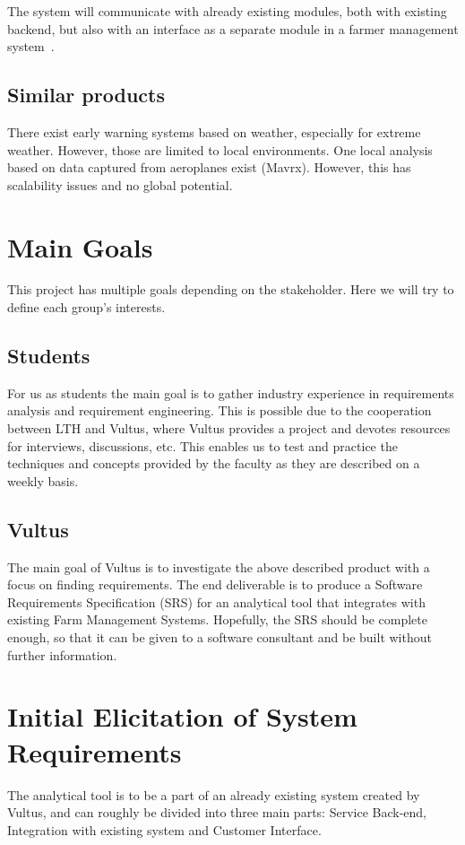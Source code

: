 \documentclass[a4paper]{article}
\begin{document}
The system will communicate with already existing modules, both with existing backend, but also with an interface as a separate module in a farmer management system~\cite{farmer_management_system}.

\subsection{Similar products}
There exist early warning systems based on weather, especially for extreme weather. However, those are limited to local environments. One local analysis based on data captured from aeroplanes exist (Mavrx). However, this has scalability issues and no global potential.


\section{Main Goals}
This project has multiple goals depending on the stakeholder. Here we will try to define each group's interests.

\subsection{Students}
For us as students the main goal is to gather industry experience in requirements analysis and requirement engineering. This is possible due to the cooperation between LTH and Vultus, where Vultus provides a project and devotes resources for interviews, discussions, etc. This enables us to test and practice the techniques and concepts provided by the faculty as they are described on a weekly basis.

\subsection{Vultus}
The main goal of Vultus is to investigate the above described product with a focus on finding requirements. The end deliverable is to produce a Software Requirements Specification (SRS) for an analytical tool that integrates with existing Farm Management Systems. Hopefully, the SRS should be complete enough, so that it can be given to a software consultant and be built without further information.

\section{Initial Elicitation of System Requirements}
The analytical tool is to be a part of an already existing system created by Vultus, and can roughly be divided into three main parts: Service Back-end, Integration with existing system and Customer Interface.
\end{document}
